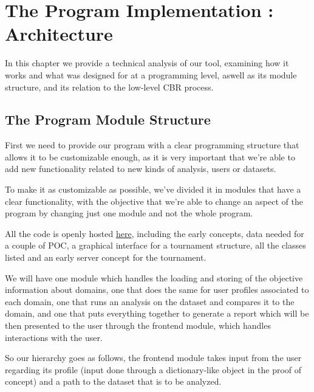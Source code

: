 %
%

\chapter{The Program Implementation : Architecture}


\begin{resumen}
In this chapter we provide a technical analysis of our tool, examining how it works and what was designed for at a programming level, aswell as its module structure, and its relation to the low-level CBR process.
\end{resumen}

\linespread{1.6}

\section{The Program Module Structure}

First we need to provide our program with a clear programming structure that allows it to be customizable enough, as it is very important that we're able to add new functionality related to new kinds of analysis, users or datasets.

To make it as customizable as possible, we've divided it in modules that have a clear functionality, with the objective that we're able to change an aspect of the program by changing just one module and not the whole program.

All the code is openly hosted \href{https://www.github.com/jorses/tfg}{here}, including the early concepts, data needed for a couple of POC, a graphical interface for a tournament structure, all the classes listed and an early server concept for the tournament.

We will have one module which handles the loading and storing of the objective information about domains, one that does the same for user profiles associated to each domain, one that runs an analysis on the dataset and compares it to the domain, and one that puts everything together to generate a report which will be then presented to the user through the frontend module, which handles interactions with the user.

So our hierarchy goes as follows, the frontend module takes input from the user regarding its profile (input done through a dictionary-like object in the proof of concept) and a path to the dataset that is to be analyzed.

